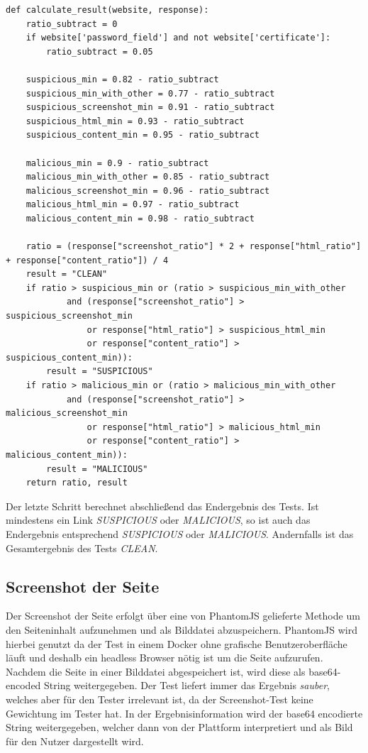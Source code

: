 \begin{scriptsize}
\begin{lstlisting}
def calculate_result(website, response):
    ratio_subtract = 0
    if website['password_field'] and not website['certificate']:
        ratio_subtract = 0.05

    suspicious_min = 0.82 - ratio_subtract
    suspicious_min_with_other = 0.77 - ratio_subtract
    suspicious_screenshot_min = 0.91 - ratio_subtract
    suspicious_html_min = 0.93 - ratio_subtract
    suspicious_content_min = 0.95 - ratio_subtract

    malicious_min = 0.9 - ratio_subtract
    malicious_min_with_other = 0.85 - ratio_subtract
    malicious_screenshot_min = 0.96 - ratio_subtract
    malicious_html_min = 0.97 - ratio_subtract
    malicious_content_min = 0.98 - ratio_subtract

    ratio = (response["screenshot_ratio"] * 2 + response["html_ratio"] + response["content_ratio"]) / 4
    result = "CLEAN"
    if ratio > suspicious_min or (ratio > suspicious_min_with_other
            and (response["screenshot_ratio"] > suspicious_screenshot_min
                or response["html_ratio"] > suspicious_html_min
                or response["content_ratio"] > suspicious_content_min)):
        result = "SUSPICIOUS"
    if ratio > malicious_min or (ratio > malicious_min_with_other
            and (response["screenshot_ratio"] > malicious_screenshot_min
                or response["html_ratio"] > malicious_html_min
                or response["content_ratio"] > malicious_content_min)):
        result = "MALICIOUS"
    return ratio, result
\end{lstlisting}
\end{scriptsize}

Der letzte Schritt berechnet abschließend das Endergebnis des Tests. Ist mindestens ein Link \textit{SUSPICIOUS} oder \textit{MALICIOUS}, so ist auch das Endergebnis entsprechend \textit{SUSPICIOUS} oder \textit{MALICIOUS}. Andernfalls ist das Gesamtergebnis des Tests \textit{CLEAN}.

\subsection{Screenshot der Seite}
Der Screenshot der Seite erfolgt über eine von PhantomJS gelieferte Methode um den Seiteninhalt aufzunehmen und als Bilddatei abzuspeichern. PhantomJS wird hierbei genutzt da der Test in einem Docker ohne grafische Benutzeroberfläche läuft und deshalb ein headless Browser nötig ist um die Seite aufzurufen. Nachdem die Seite in einer Bilddatei abgespeichert ist, wird diese als base64-encoded String weitergegeben. Der Test liefert immer das Ergebnis \textit{sauber}, welches aber für den Tester irrelevant ist, da der Screenshot-Test keine Gewichtung im Tester hat. In der Ergebnisinformation wird der base64 encodierte String weitergegeben, welcher dann von der Plattform interpretiert und als Bild für den Nutzer dargestellt wird.
